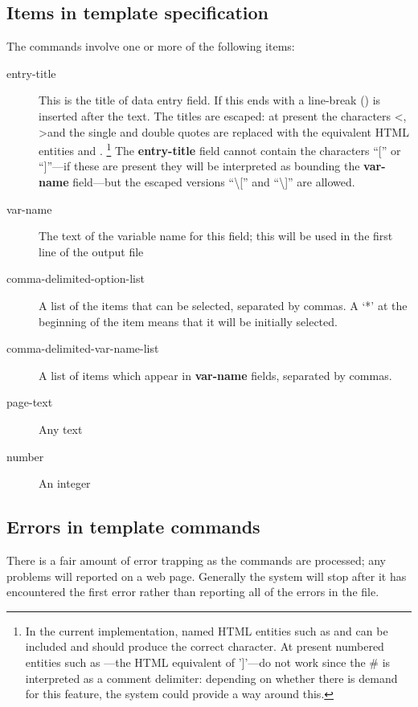 \documentclass[letterpaper,10pt,english]{sphinxmanual}
\begin{document}
\subsection{Items in template specification}
\label{forms:items-in-template-specification}
The commands involve one or more of the following items:
\begin{description}
\item[{entry-title}] \leavevmode
This is the title of data entry field. If this ends with \code{/} a
line-break () is inserted after the text. The titles are
escaped: at present the characters \textless{}, \textgreater{}and the single and double
quotes are replaced with the equivalent HTML entities
 and . \footnote{
In the current implementation, named HTML entities such as 
and  can be included and should produce the correct
character. At present numbered entities such as —the HTML
equivalent of ’{]}’—do not work since the \# is interpreted as a comment
delimiter: depending on whether there is demand for this feature, the
system could provide a way around this.
} The \textbf{entry-title}
field cannot contain the characters “{[}” or “{]}”—if these are present
they will be interpreted as bounding the \textbf{var-name} field—but the
escaped versions “\textbackslash{}{[}” and “\textbackslash{}{]}” are allowed.

\item[{var-name}] \leavevmode
The text of the variable name for this field; this will be used in
the first line of the  output file

\item[{comma-delimited-option-list}] \leavevmode
A list of the items that can be selected, separated by commas. A
‘*’ at the beginning of the item means that it will be initially
selected.

\item[{comma-delimited-var-name-list}] \leavevmode
A list of items which appear in \textbf{var-name} fields, separated by
commas.

\item[{page-text}] \leavevmode
Any text

\item[{number}] \leavevmode
An integer

\end{description}


\subsection{Errors in template commands}
\label{forms:errors-in-template-commands}
There is a fair amount of error trapping as the commands are processed;
any problems will reported on a web page. Generally the system will
stop after it has encountered the first error rather than reporting
all of the errors in the file.
\end{document}
